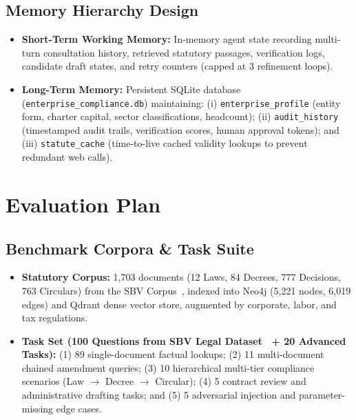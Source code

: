 \subsection{Memory Hierarchy Design}
\begin{itemize}
  \item \textbf{Short-Term Working Memory:} In-memory agent state recording multi-turn consultation history, retrieved statutory passages, verification logs, candidate draft states, and retry counters (capped at 3 refinement loops).
  \item \textbf{Long-Term Memory:} Persistent SQLite database (\texttt{enterprise\_compliance.db}) maintaining:
    (i) \texttt{enterprise\_profile} (entity form, charter capital, sector classifications, headcount);
    (ii) \texttt{audit\_history} (timestamped audit trails, verification scores, human approval tokens); and
    (iii) \texttt{statute\_cache} (time-to-live cached validity lookups to prevent redundant web calls).
\end{itemize}

\section{Evaluation Plan}

\subsection{Benchmark Corpora \& Task Suite}
\begin{itemize}
  \item \textbf{Statutory Corpus:} 1,703 documents (12 Laws, 84 Decrees, 777 Decisions, 763 Circulars) from the SBV Corpus~\cite{phan2026sbvlawgraph}, indexed into Neo4j (5,221 nodes, 6,019 edges) and Qdrant dense vector store, augmented by corporate, labor, and tax regulations.
  \item \textbf{Task Set (100 Questions from SBV Legal Dataset~\cite{phan2026sbvlawgraph} + 20 Advanced Tasks):}
    (1) 89 single-document factual lookups;
    (2) 11 multi-document chained amendment queries;
    (3) 10 hierarchical multi-tier compliance scenarios (Law $\rightarrow$ Decree $\rightarrow$ Circular);
    (4) 5 contract review and administrative drafting tasks; and
    (5) 5 adversarial injection and parameter-missing edge cases.
\end{itemize}

